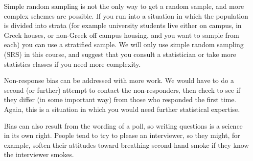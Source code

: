   Simple random sampling is not the only way to get a random
  sample, and more complex schemes are possible.  If you run into a
  situation in which the population is divided into strata (for
  example university students live either on campus, in Greek houses,
  or non-Greek off campus housing, and you want to sample from each)
  you can use a stratified sample.  We will only use simple random
  sampling (SRS) in this course, and suggest that you consult a
  statistician or take more statistics classes if you need more
  complexity. 

 Non-response bias can be addressed with more work.  We would have to
 do a second (or further) attempt to contact the non-responders, then 
 check to see if they differ (in some important way) from those who
 responded the first time.  Again, this is a situation in which you
 would need further statistical expertise.

 Bias can also result from the wording of a poll, so writing questions
 is a science in its own right.  People tend to try
 to please an interviewer, so they might, for example, soften their
 attitudes toward breathing second-hand smoke if they know the interviewer
 smokes. 
\newpage

